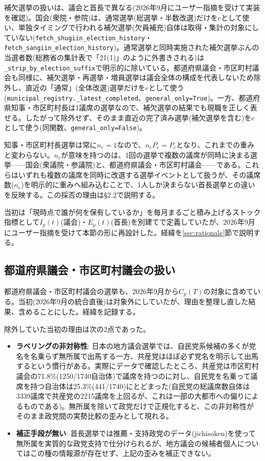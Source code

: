\documentclass[a4paper,11pt]{ltjsarticle}
\begin{document}
補欠選挙の扱いは、議会と首長で異なる(2026年9月にユーザー指摘を受けて実装を確認)。国会(衆院・参院)は、通常選挙(総選挙・半数改選)だけを$e$として使い、単独タイミングで行われる補欠選挙(欠員補充)自体は取得・集計の対象にしていない(\texttt{fetch\_shugiin\_election\_history}・\texttt{fetch\_sangiin\_election\_history})。通常選挙と同時実施された補欠選挙ぶんの当選者数(総務省の集計表で「21(1)」のように外書きされる)は\texttt{\_strip\_by\_election\_suffix}で明示的に除いている。都道府県議会・市区町村議会も同様に、補欠選挙・再選挙・増員選挙は議会全体の構成を代表しないため除外し、直近の「通常」(全体改選)選挙だけを$e$として使う(\texttt{municipal\_registry.\_latest\_completed}、\texttt{general\_only=True})。一方、都道府県知事・市区町村長は1議席の選挙なので、補欠選挙の結果でも現職を正しく表せる。したがって除外せず、そのまま直近の完了済み選挙(補欠選挙を含む)を$e$として使う(同関数、\texttt{general\_only=False})。

知事・市区町村長選挙は常に$n_e=1$なので、$n_eP_e=P_e$となり、これまでの重みと変わらない。$n_e$が意味を持つのは、1回の選挙で複数の議席が同時に決まる選挙——国会(衆議院・参議院)と、都道府県議会・市区町村議会——である。これらはいずれも複数の議席を同時に改選する選挙イベントとして扱うが、その議席数($n_e$)を明示的に重みへ組み込むことで、1人しか決まらない首長選挙との違いを反映する。この採否の理由は\S2.2で説明する。

当初は「現時点で誰が何を保有しているか」を毎月まるごと積み上げるストック指標として$I_p(t)$(議会)・$E_p(t)$(首長)を別建てで定義していたが、2026年9月にユーザー指摘を受けて本節の形に再設計した。経緯を\ref{sec:rationale}節で説明する。

\subsection{都道府県議会・市区町村議会の扱い}
\label{sec:ip-definition}

都道府県議会・市区町村議会の選挙も、2026年9月から$C_p(T)$の対象に含めている。当初(2026年9月の統合直後)は対象外にしていたが、理由を整理し直した結果、含めることにした。経緯を記録する。

除外していた当初の理由は次の2点であった。

\begin{itemize}
  \item \textbf{ラベリングの非対称性}: 日本の地方議会選挙では、自民党系候補の多くが党名を名乗らず無所属で出馬する一方、共産党はほぼ必ず党名を明示して出馬するという慣行がある。実際にデータで確認したところ、共産党は市区町村議会の71.8\%(1250/1740自治体)で議席を持つのに対し、自民党を名乗って議席を持つ自治体は25.3\%(441/1740)にとどまった(自民党の総議席数自体は3339議席で共産党の2215議席を上回るが、これは一部の大都市への偏りによるものである)。無所属を除いて政党だけで正規化すると、この非対称性がそのまま政党間の実勢比較の歪みとして現れる。
  \item \textbf{補正手段が無い}: 首長選挙では推薦・支持政党のデータ(jichisoken)を使って無所属を実質的な政党支持で仕分けられるが、地方議会の候補者個人についてはこの種の情報源が存在せず、上記の歪みを補正できない。
\end{itemize}
\end{document}

